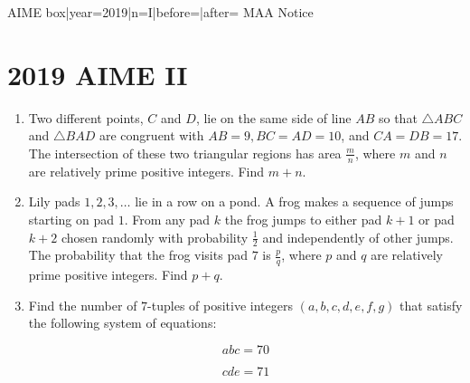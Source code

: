 \documentclass{article}
\begin{document}
\begin{enumerate}[label=\arabic*., itemsep=0.5em]
{{AIME box|year=2019|n=I|before=|after=}}
{{MAA Notice}}\par \vspace{0.5em}\end{enumerate}\newpage\section*{2019 AIME II}\begin{enumerate}[label=\arabic*., itemsep=0.5em]\item Two different points, $C$ and $D$, lie on the same side of line $AB$ so that $\triangle ABC$ and $\triangle BAD$ are congruent with $AB=9,BC=AD=10$, and $CA=DB=17$. The intersection of these two triangular regions has area $\tfrac{m}{n}$, where $m$ and $n$ are relatively prime positive integers. Find $m+n$.\par \vspace{0.5em}\item Lily pads $1,2,3,\ldots$ lie in a row on a pond. A frog makes a sequence of jumps starting on pad $1$. From any pad $k$ the frog jumps to either pad $k+1$ or pad $k+2$ chosen randomly with probability $\tfrac{1}{2}$ and independently of other jumps. The probability that the frog visits pad $7$ is $\tfrac{p}{q}$, where $p$ and $q$ are relatively prime positive integers. Find $p+q$.\par \vspace{0.5em}\item Find the number of $7$-tuples of positive integers $(a,b,c,d,e,f,g)$ that satisfy the following system of equations: 

\begin{equation*}
abc=70
\end{equation*}


\begin{equation*}
cde=71
\end{equation*}



\end{enumerate}
\end{document}
